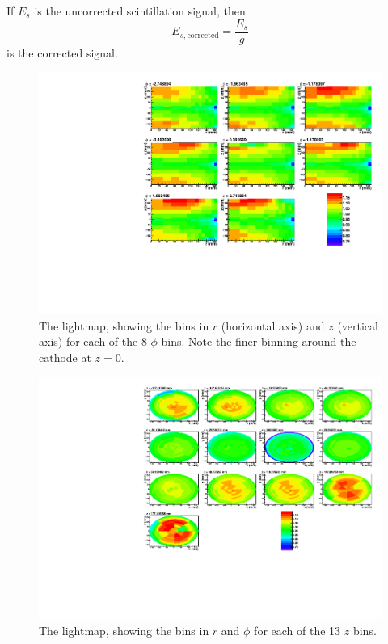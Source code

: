 \documentclass[herrin-thesis.tex]{subfiles}
\begin{document}
If \(E_{s}\) is the uncorrected scintillation signal, then
\begin{equation}
E_{s,\text{corrected}} = \frac{E_s}{g}
\label{eq:lightmap_corrected_signal}
\end{equation}
is the corrected signal.

\begin{figure}
\centering
\includegraphics[width=\textwidth]{./plots/lightmap_binned_phi_slices.pdf}
\caption[Lightmap \(\phi\) slices]{The lightmap, showing the bins in \(r\) (horizontal axis) and \(z\) (vertical axis) for each of the 8 \(\phi\) bins. Note the finer binning around the cathode at \(z=0\).}
\label{fig:lightmap_binned_phi_slices}
\end{figure}

\begin{figure}
\centering
\includegraphics[width=\textwidth]{./plots/lightmap_binned_z_slices.pdf}
\caption[Lightmap \(z\) slices]{The lightmap, showing the bins in \(r\) and \(\phi\) for each of the 13 \(z\) bins.}
\label{fig:lightmap_binned_z_slices}
\end{figure}
\end{document}
